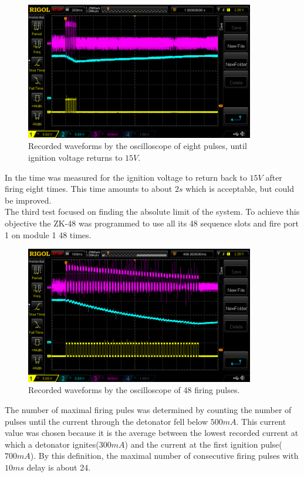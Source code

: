 \begin{figure}[!ht]
    \centering
    \includegraphics[width=10cm]{./Figures/eight_pulses_wide.png}
    \caption{Recorded waveforms by the oscilloscope of eight pulses, until ignition voltage returns to $15V$.}
    \label{fig:eight_pulses_wide}     
\end{figure}

\noindent In  the time was measured for the ignition voltage to return back to $15V$ after firing eight times. This time amounts to about $2s$ which is acceptable, but could be improved.\\ 

\noindent The third test focused on finding the absolute limit of the system. To achieve this objective the ZK-48 was programmed to use all its 48 sequence slots and fire port 1 on module 1 48 times. 

\begin{figure}[!ht]
    \centering
    \includegraphics[width=10cm]{./Figures/max_pulses.png}
    \caption{Recorded waveforms by the oscilloscope of 48 firing pulses.}
    \label{fig:max_pulses}     
\end{figure}

\noindent The number of maximal firing pules was determined by counting the number of pulses until the current through the detonator fell below $500mA$. This current value was chosen because it is the average between the lowest recorded current at which a detonator ignites($300mA$) and the current at the first ignition pulse($700mA$). By this definition, the maximal number of consecutive firing pulses with $10ms$ delay is about 24.

